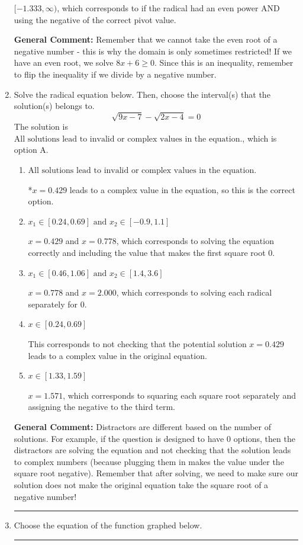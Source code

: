 \documentclass{extbook}[14pt]
\newcommand{\litem}[1]{\item #1

\rule{\textwidth}{0.4pt}}
\begin{document}
\begin{enumerate}
{\begin{enumerate}[label=\Alph*.]
$[-1.333, \infty)$, which corresponds to if the radical had an even power AND using the negative of the correct pivot value.
\end{enumerate}

\textbf{General Comment:} Remember that we cannot take the even root of a negative number - this is why the domain is only sometimes restricted! If we have an even root, we solve $8 x + 6 \geq 0$. Since this is an inequality, remember to flip the inequality if we divide by a negative number.
}
\litem{
Solve the radical equation below. Then, choose the interval(s) that the solution(s) belongs to.
\[ \sqrt{9 x - 7} - \sqrt{2 x - 4} = 0 \]The solution is \( \text{All solutions lead to invalid or complex values in the equation.} \), which is option A.\begin{enumerate}[label=\Alph*.]
\item \( \text{All solutions lead to invalid or complex values in the equation.} \)

*$x = 0.429$ leads to a complex value in the equation, so this is the correct option.
\item \( x_1 \in [0.24, 0.69] \text{ and } x_2 \in [-0.9,1.1] \)

$x = 0.429$ and $x = 0.778$, which corresponds to solving the equation correctly and including the value that makes the first square root 0.
\item \( x_1 \in [0.46, 1.06] \text{ and } x_2 \in [1.4,3.6] \)

$x = 0.778$ and $x = 2.000$, which corresponds to solving each radical separately for 0.
\item \( x \in [0.24,0.69] \)

This corresponds to not checking that the potential solution $x = 0.429$ leads to a complex value in the original equation.
\item \( x \in [1.33,1.59] \)

$x = 1.571$, which corresponds to squaring each square root separately and assigning the negative to the third term.
\end{enumerate}

\textbf{General Comment:} Distractors are different based on the number of solutions. For example, if the question is designed to have 0 options, then the distractors are solving the equation and not checking that the solution leads to complex numbers (because plugging them in makes the value under the square root negative). Remember that after solving, we need to make sure our solution does not make the original equation take the square root of a negative number!
}
\litem{
Choose the equation of the function graphed below.

}
\end{enumerate}
\end{document}
